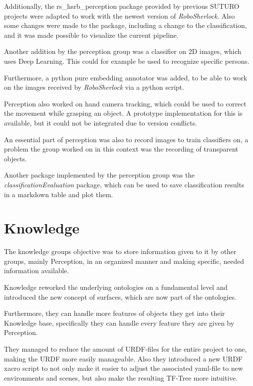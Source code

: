 \documentclass[main.tex]{subfiles}
\begin{document}
		Additionally, the rs\_hsrb\_perception package provided by previous SUTURO projects were adapted to work with the newest version of \textit{RoboSherlock}. Also some changes were made to the package, including a change to the classification, and it was made possible to visualize the current pipeline.
		
		Another addition by the perception group was a classifier on 2D images, which uses Deep Learning. This could for example be used to recognize specific persons.
		
		Furthermore, a python pure embedding annotator was added, to be able to work on the images received by \textit{RoboSherlock} via a python script.
		
		Perception also worked on hand camera tracking, which could be used to correct the movement while grasping an object. A prototype implementation for this is available, but it could not be integrated due to version conflicts. 
		
		An essential part of perception was also to record images to train classifiers on, a problem the group worked on in this context was the recording of transparent objects.
		
		Another package implemented by the perception group was the \textit{classificationEvaluation} package, which can be used to save classification results in a markdown table and plot them.
		
		
		
		
		\section{Knowledge}
		The knowledge groups objective was to store information given to it by other groups, mainly Perception, in an organized manner and making specific, needed information available.
		
		Knowledge reworked the underlying ontologies on a fundamental level and introduced the new concept of surfaces, which are now part of the ontologies.
		
		Furthermore, they can handle more features of objects they get into their Knowledge base, specifically they can handle every feature they are given by Perception.
		
		They managed to reduce the amount of URDF-files for the entire project to one, making the URDF more easily manageable.  Also they introduced a new URDF xacro script to not only make it easier to adjust the associated yaml-file to new environments and scenes, but also make the resulting TF-Tree more intuitive.
		
\end{document}
